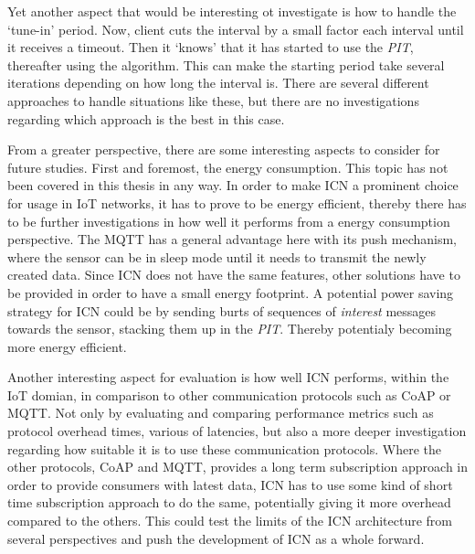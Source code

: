 Yet another aspect that would be interesting ot investigate is how to handle the `tune-in' period. Now, client cuts the interval by a small factor each interval until it receives a timeout. Then it `knows' that it has started to use the \textit{PIT}, thereafter using the algorithm. This can make the starting period take several iterations depending on how long the interval is. There are several different approaches to handle situations like these, but there are no investigations regarding which approach is the best in this case.

From a greater perspective, there are some interesting aspects to consider for future studies. First and foremost, the energy consumption. This topic has not been covered in this thesis in any way. In order to make ICN a prominent choice for usage in IoT networks, it has to prove to be energy efficient, thereby there has to be further investigations in how well it performs from a energy consumption perspective. The MQTT has a general advantage here with its push mechanism, where the sensor can be in sleep mode until it needs to transmit the newly created data. Since ICN does not have the same features, other solutions have to be provided in order to have a small energy footprint. A potential power saving strategy for ICN could be by sending burts of sequences of \textit{interest} messages towards the sensor, stacking them up in the \textit{PIT}. Thereby potentialy becoming more energy efficient. 

Another interesting aspect for evaluation is how well ICN performs, within the IoT domian, in comparison to other communication protocols such as CoAP or MQTT. Not only by evaluating and comparing performance metrics such as protocol overhead times, various of latencies, but also a more deeper investigation regarding how suitable it is to use these communication protocols. Where the other protocols, CoAP and MQTT, provides a long term subscription approach in order to provide consumers with latest data, ICN has to use some kind of short time subscription approach to do the same, potentially giving it more overhead compared to the others.
This could test the limits of the ICN architecture from several perspectives and push the development of ICN as a whole forward.


%
%



